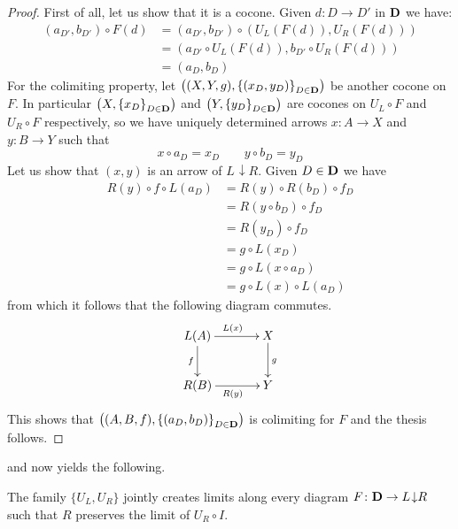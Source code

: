 \documentclass[runningheads,envcountsect]{lipics-v2021}
\def\D{\textbf {\textup{D}}}
\newcommand{\comma}[2]{#1\hspace{1pt} {\downarrow}#2}
\begin{document}
\begin{proof}
	First of all, let us show that it is a cocone. Given $d\colon D\to D'$ in $\D$ we have:
	\begin{align*}
		\left(a_{D'}, b_{D'}\right)\circ F(d)&=	\left(a_{D'}, b_{D'}\right)\circ \left(U_L(F(d)), U_R(F(d))\right)\\&=\left( a_{D'}\circ U_L(F(d)),  b_{D'}\circ U_R(F(d)) \right)\\&=\left(a_D, b_D\right)
	\end{align*}
	For the colimiting property, let $\left((X, Y, g), \left\{\left(x_D, y_D\right)\right\}_{D\in \D}\right)$ be another cocone on $F$. In particular $\left(X, \left\{x_D\right\}_{D\in \D}\right)$ and $\left(Y, \left\{y_D\right\}_{D\in \D}\right)$ are cocones on $U_L\circ F$ and $U_R\circ F$ respectively, so we have uniquely determined arrows $x\colon A\rightarrow X$ and $y\colon B\rightarrow Y$ such that 
	\[x\circ a_D= x_D \qquad y\circ b_D= y_D\]
	Let us show that $(x,y)$ is an arrow of $\comma{L}{R}$. Given $D\in \D$ we have
	\begin{align*}
		R(y)\circ f\circ L(a_D)&=R(y)\circ R\left(b_D\right)\circ f_D\\&=R\left(y\circ b_D\right)\circ f_D\\&=R\left(y_D\right)\circ f_D\\&= g\circ L\left(x_D\right)\\&=g\circ L\left(x\circ a_D\right)\\&=g\circ L(x)\circ L\left(a_D\right)
	\end{align*}
	from which it follows  that the following diagram commutes.
	\[\xymatrix@C=35pt{L(A)\ar[d]_{f} \ar[r]^{L(x)} & X \ar[d]^{g}\\ R(B) \ar[r]_{R(y)}& Y}\]
	This shows that $\left((A, B, f), \left\{(a_D, b_D)\right\}_{D\in \D}\right)$ is colimiting for $F$ and the thesis follows.    
\end{proof} 


 and  now yields the following.
\begin{corollary}\label{lim} The family $\{U_L, U_R\}$ jointly creates limits along every diagram $F\colon \D\to \comma{L}{R}$ such that $R$ preserves the limit of $U_R\circ I$.
\end{corollary}
\end{document}
